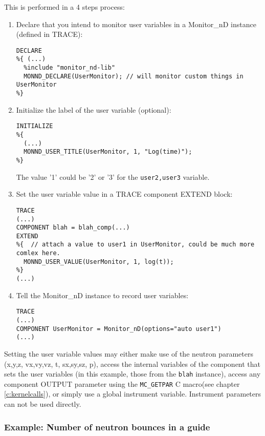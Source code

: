 This is performed in a 4 steps process:
\begin{enumerate}
\item Declare that you intend to monitor user variables in a Monitor\_nD instance (defined in TRACE):
\begin{verbatim}
DECLARE
%{ (...)
  %include "monitor_nd-lib"
  MONND_DECLARE(UserMonitor); // will monitor custom things in UserMonitor
%}
\end{verbatim}
\item Initialize the label of the user variable (optional):
\begin{verbatim}
INITIALIZE
%{
  (...)
  MONND_USER_TITLE(UserMonitor, 1, "Log(time)");
%}
\end{verbatim}
The value '1' could be '2' or '3' for the \verb+user2,user3+ variable.
\item Set the user variable value in a TRACE component EXTEND block:
\begin{verbatim}
TRACE
(...)
COMPONENT blah = blah_comp(...)
EXTEND
%{  // attach a value to user1 in UserMonitor, could be much more comlex here.
  MONND_USER_VALUE(UserMonitor, 1, log(t));
%}
(...)
\end{verbatim}
\item Tell the Monitor\_nD instance to record user variables:
\begin{verbatim}
TRACE
(...)
COMPONENT UserMonitor = Monitor_nD(options="auto user1")
(...)
\end{verbatim}
\end{enumerate}
Setting the user variable values may either make use of the neutron parameters (x,y,z, vx,vy,vz, t, sx,sy,sz, p), access the internal variables of the component that sets the user variables (in this example, those from the \verb+blah+ instance), access any component OUTPUT parameter  using the \verb+MC_GETPAR+ C macro(see chapter \ref{c:kernelcalls}), or simply use a global instrument variable. Instrument parameters can not be used directly.

\subsubsection{Example: Number of neutron bounces in a guide}

